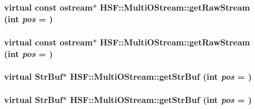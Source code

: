 \label{classHSF_1_1MultiOStream_ac0ac202ca73eb0c39d4b4b3f8f462f34}
\hypertarget{classHSF_1_1MultiOStream_afb114bb87da89f7ea7ac65af6ffc65f2}{
\subsubsection[{getRawStream}]{\setlength{\rightskip}{0pt plus 5cm}virtual const ostream$\ast$ HSF::MultiOStream::getRawStream (int {\em pos} = {})}}
\label{classHSF_1_1MultiOStream_afb114bb87da89f7ea7ac65af6ffc65f2}
\hypertarget{classHSF_1_1MultiOStream_afb114bb87da89f7ea7ac65af6ffc65f2}{
\subsubsection[{getRawStream}]{\setlength{\rightskip}{0pt plus 5cm}virtual const ostream$\ast$ HSF::MultiOStream::getRawStream (int {\em pos} = {})}}
\label{classHSF_1_1MultiOStream_afb114bb87da89f7ea7ac65af6ffc65f2}
\hypertarget{classHSF_1_1MultiOStream_a2a33520e221422d2a10e1c3eace3029b}{
\subsubsection[{getStrBuf}]{\setlength{\rightskip}{0pt plus 5cm}virtual {\bf StrBuf}$\ast$ HSF::MultiOStream::getStrBuf (int {\em pos} = {})}}
\label{classHSF_1_1MultiOStream_a2a33520e221422d2a10e1c3eace3029b}
\hypertarget{classHSF_1_1MultiOStream_a2a33520e221422d2a10e1c3eace3029b}{
\subsubsection[{getStrBuf}]{\setlength{\rightskip}{0pt plus 5cm}virtual {\bf StrBuf}$\ast$ HSF::MultiOStream::getStrBuf (int {\em pos} = {})}}
